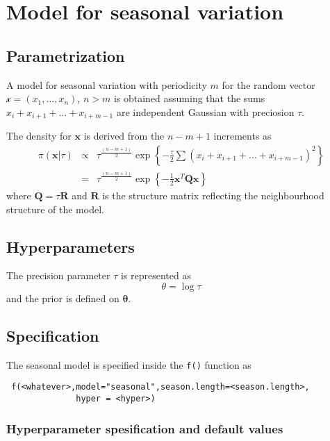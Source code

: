 \documentclass[a4paper,11pt]{article}
\begin{document}
\section*{Model for seasonal variation}

\subsection*{Parametrization}

A model for seasonal variation with periodicity $m$ for the random
vector $\mathcal{x}=(x_1,\dots,x_n)$, $n>m$ is obtained assuming that
the sums $x_i+x_{i+1}+\dots+x_{i+m-1}$ are independent Gaussian with
preciosion $\tau$.

The density for $\mathbf{x}$ is derived from the $n-m+1$ increments as
\begin{eqnarray}
    \pi(\mathbf{x}|\tau) &\propto& \tau^{\frac{(n-m+1)}{2}} \exp\left\{-\frac{\tau}{2}\sum (x_i+x_{i+1}+\dots+x_{i+m-1})^2\right\}\\
    & = &\tau^{\frac{(n-m+1)}{2}}\exp\left\{-\frac{1}{2}\mathbf{x}^T\mathbf{Q}\mathbf{x} \right\}
\end{eqnarray}
where $\mathbf{Q}=\tau\mathbf{R}$ and $\mathbf{R}$ is the structure
matrix reflecting the neighbourhood structure of the model.


\subsection*{Hyperparameters}

The precision parameter $\tau$ is represented as
\begin{displaymath}
    \theta =\log \tau
\end{displaymath}
and the prior is defined on $\mathbf{\theta}$. 

\subsection*{Specification}

The seasonal model is specified inside the {\tt f()} function as
\begin{verbatim}
 f(<whatever>,model="seasonal",season.length=<season.length>,
              hyper = <hyper>)
\end{verbatim}
 
\subsubsection*{Hyperparameter spesification and default values}

\end{document}
